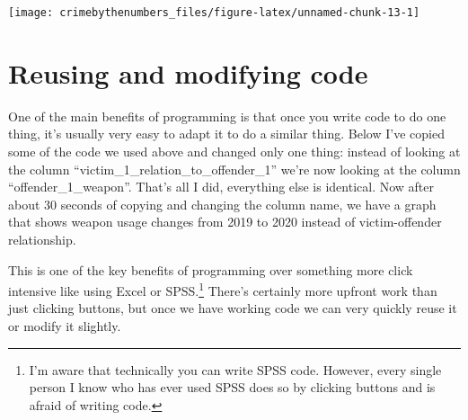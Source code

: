 \documentclass[
]{krantz}
\makeatletter
\newenvironment{Shaded}{\begin{snugshade}}{\end{snugshade}}
\newcommand{\AttributeTok}[1]{\textcolor[rgb]{0.61,0.61,0.61}{#1}}
\newcommand{\FunctionTok}[1]{\textcolor[rgb]{0,0,0}{#1}}
\newcommand{\NormalTok}[1]{#1}
\newcommand{\OtherTok}[1]{\textcolor[rgb]{0.37,0.37,0.37}{#1}}
\newcommand{\SpecialCharTok}[1]{\textcolor[rgb]{0,0,0}{#1}}
\newcommand{\StringTok}[1]{\textcolor[rgb]{0.5,0.5,0.5}{#1}}
\newenvironment{kframe}{%
\medskip{}
\setlength{\fboxsep}{.8em}
 \def\at@end@of@kframe{}%
 \ifinner\ifhmode%
  \def\at@end@of@kframe{\end{minipage}}%
  \begin{minipage}{\columnwidth}%
 \fi\fi%
 \def\FrameCommand##1{\hskip\@totalleftmargin \hskip-\fboxsep
 \colorbox{shadecolor}{##1}\hskip-\fboxsep
     \hskip-\linewidth \hskip-\@totalleftmargin \hskip\columnwidth}%
 \MakeFramed {\advance\hsize-\width
   \@totalleftmargin\z@ \linewidth\hsize
   \@setminipage}}%
 {\par\unskip\endMakeFramed%
 \at@end@of@kframe}
\renewenvironment{Shaded}{\begin{kframe}}{\end{kframe}}
\makeatother
\begin{document}
\begin{Shaded}
\end{Shaded}

\begin{center}\texttt{[image: crimebythenumbers\_files/figure-latex/unnamed-chunk-13-1]} \end{center}

\hypertarget{reusing-and-modifying-code}{%
\section{Reusing and modifying
code}\label{reusing-and-modifying-code}}

One of the main benefits of programming is that once you
write code to do one thing, it's usually very easy to adapt
it to do a similar thing. Below I've copied some of the code
we used above and changed only one thing: instead of looking
at the column ``victim\_1\_relation\_to\_offender\_1'' we're
now looking at the column ``offender\_1\_weapon''. That's
all I did, everything else is identical. Now after about 30
seconds of copying and changing the column name, we have a
graph that shows weapon usage changes from 2019 to 2020
instead of victim-offender relationship.

This is one of the key benefits of programming over
something more click intensive like using Excel or
SPSS.\footnote{I'm aware that technically you can write SPSS
  code. However, every single person I know who has ever
  used SPSS does so by clicking buttons and is afraid of
  writing code.} There's certainly more upfront work than
just clicking buttons, but once we have working code we can
very quickly reuse it or modify it slightly.
\end{document}
